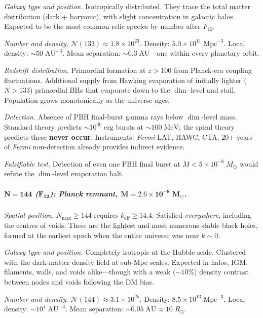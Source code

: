 \documentclass[12pt,a4paper]{article}
\begin{document}
\textit{Galaxy type and position.}\; Isotropically distributed.  They trace the total matter distribution (dark + baryonic), with slight concentration in galactic halos.  Expected to be the most common relic species by number after $F_{12}$.

\textit{Number and density.}\; $\mathcal{N}(133) \approx 1.8 \times 10^{23}$.  Density: $5.0 \times 10^{11}\;\mathrm{Mpc}^{-3}$.  Local density: $\sim 50\;\mathrm{AU}^{-3}$.  Mean separation: $\sim 0.3\;\mathrm{AU}$---one within every planetary orbit.

\textit{Redshift distribution.}\; Primordial formation at $z > 100$ from Planck-era coupling fluctuations.  Additional supply from Hawking evaporation of initially lighter ($N > 133$) primordial BHs that evaporate down to the $\dim$-level and stall.  Population grows monotonically as the universe ages.

\textit{Detection.}\; Absence of PBH final-burst gamma rays below $\dim$-level mass.  Standard theory predicts $\sim 10^{30}\;\mathrm{erg}$ bursts at $\sim 100\;\mathrm{MeV}$; the spiral theory predicts these \textbf{never occur}.  Instruments: \emph{Fermi}-LAT, HAWC, CTA.  20+ years of \emph{Fermi} non-detection already provides indirect evidence.

\textit{Falsifiable test.}\; Detection of even one PBH final burst at $M < 5 \times 10^{-6}\;M_\odot$ would refute the $\dim$-level evaporation halt.

\subparagraph{$\boldsymbol{N = 144}$ ($\boldsymbol{F_{12}}$): Planck remnant, $\boldsymbol{M = 2.6 \times 10^{-8}\;M_\odot}$.}

\textit{Spatial position.}\; $N_{\max} \geq 144$ requires $k_{\mathrm{eff}} \geq 14.4$.  Satisfied \emph{everywhere}, including the centres of voids.  These are the lightest and most numerous stable black holes, formed at the earliest epoch when the entire universe was near $k \sim 0$.

\textit{Galaxy type and position.}\; Completely isotropic at the Hubble scale.  Clustered with the dark-matter density field at sub-Mpc scales.  Expected in halos, IGM, filaments, walls, and voids alike---though with a weak ($\sim 10\%$) density contrast between nodes and voids following the DM bias.

\textit{Number and density.}\; $\mathcal{N}(144) \approx 3.1 \times 10^{25}$.  Density: $8.5 \times 10^{13}\;\mathrm{Mpc}^{-3}$.  Local density: $\sim 10^4\;\mathrm{AU}^{-3}$.  Mean separation: $\sim 0.05\;\mathrm{AU} \approx 10\;R_\odot$.
\end{document}
